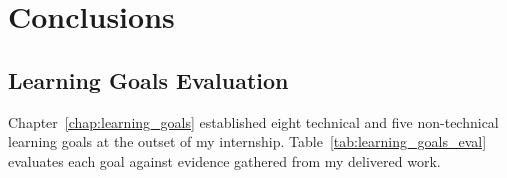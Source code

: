 
\chapter{Conclusions}
\label{chap:conclusions}

\section{Learning Goals Evaluation}
\label{sec:learning_goals_eval}

Chapter~\ref{chap:learning_goals} established eight technical and five non-technical
learning goals at the outset of my internship. Table~\ref{tab:learning_goals_eval}
evaluates each goal against evidence gathered from my delivered work.


